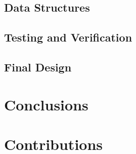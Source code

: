 \documentclass{article}
\begin{document}
\subsection{Data Structures}

\subsection{Testing and Verification}

\subsection{Final Design}


\section{Conclusions}

\clearpage

\section{Contributions}
\end{document}
